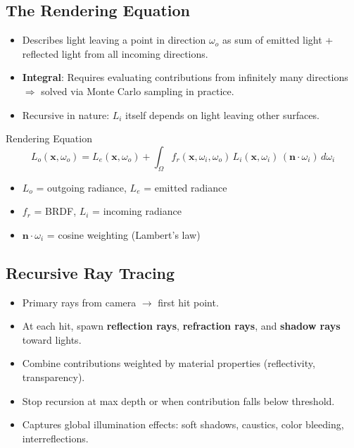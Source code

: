 \documentclass[11pt]{article}
\begin{document}
\subsection{The Rendering Equation}
\begin{itemize}
    \item Describes light leaving a point in direction $\omega_o$ as sum of emitted light + reflected light from all incoming directions.
    \item \textbf{Integral}: Requires evaluating contributions from infinitely many directions $\Rightarrow$ solved via Monte Carlo sampling in practice.
    \item Recursive in nature: $L_i$ itself depends on light leaving other surfaces.
\end{itemize}

\begin{formulabox}{Rendering Equation}
$$L_o(\mathbf{x}, \omega_o) = L_e(\mathbf{x}, \omega_o) + \int_{\Omega} f_r(\mathbf{x}, \omega_i, \omega_o) \, L_i(\mathbf{x}, \omega_i) \, (\mathbf{n} \cdot \omega_i) \, d\omega_i$$
\begin{itemize}
    \item $L_o$ = outgoing radiance, $L_e$ = emitted radiance
    \item $f_r$ = BRDF, $L_i$ = incoming radiance
    \item $\mathbf{n} \cdot \omega_i$ = cosine weighting (Lambert's law)
\end{itemize}
\end{formulabox}

\subsection{Recursive Ray Tracing}
\begin{itemize}
    \item Primary rays from camera $\rightarrow$ first hit point.
    \item At each hit, spawn \textbf{reflection rays}, \textbf{refraction rays}, and \textbf{shadow rays} toward lights.
    \item Combine contributions weighted by material properties (reflectivity, transparency).
    \item Stop recursion at max depth or when contribution falls below threshold.
    \item Captures global illumination effects: soft shadows, caustics, color bleeding, interreflections.
\end{itemize}
\end{document}
